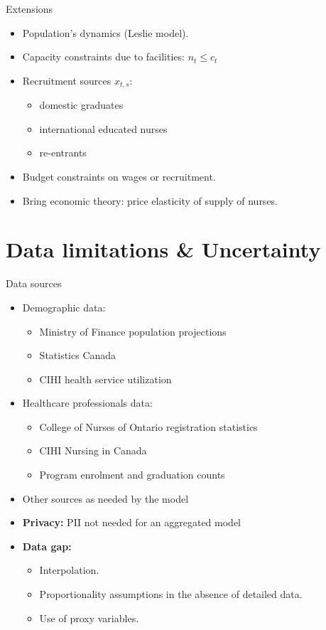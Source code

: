 \documentclass[aspectratio=169, 10pt]{beamer}
\begin{document}
\begin{frame}{Extensions}
    \begin{itemize}
        \item Population's dynamics (Leslie model).
        \item Capacity constraints due to facilities: $n_{t} \le c_{t}$
        \item Recruitment sources $x_{t,s}$:
        \begin{itemize}
            \item domestic graduates
            \item international educated nurses
            \item re-entrants
        \end{itemize}
        \item Budget constraints on wages or recruitment.
        \item Bring economic theory: price elasticity of supply of nurses.
    \end{itemize}
\end{frame}


\section{Data limitations \& Uncertainty}
\begin{frame}{Data sources}
    \begin{itemize}
        \item Demographic data:
        \begin{itemize}
            \item Ministry of Finance population projections
            \item Statistics Canada
            \item CIHI health service utilization
        \end{itemize}
        \item Healthcare professionals data:
        \begin{itemize}
            \item College of Nurses of Ontario registration statistics
            \item CIHI Nursing in Canada
            \item Program enrolment and graduation counts
        \end{itemize}
        \item Other sources as needed by the model
        \item \textbf{Privacy:} PII not needed for an aggregated model
        \item \textbf{Data gap:}
        \begin{itemize}
            \item Interpolation.
            \item Proportionality assumptions in the absence of detailed data.
            \item Use of proxy variables.
        \end{itemize}
    \end{itemize}
\end{frame}
\end{document}

